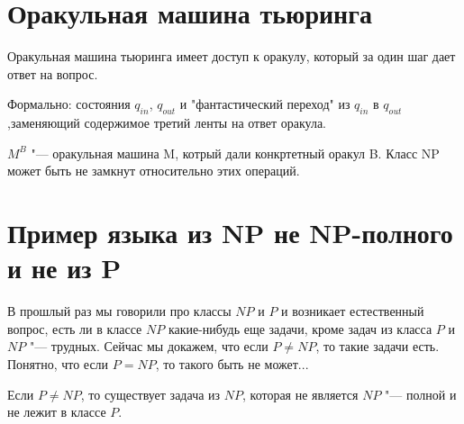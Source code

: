 ﻿
\section{Оракульная машина тьюринга}
Оракульная машина тьюринга имеет доступ к оракулу, который за один шаг
дает ответ на вопрос. 

Формально: состояния $q_{in}$, $q_{out}$  и "фантастический переход" из 
$q_{in}$ в $q_{out}$,заменяющий содержимое третий ленты на ответ оракула. 

$M^B$ "--- оракульная машина M, котрый дали конкртетный оракул B. Класс NP может 
быть не замкнут относительно этих операций. 

\section{Пример языка из NP не NP-полного и не из P}
В прошлый раз мы говорили про классы $NP$ и $P$ и 
возникает естественный вопрос, есть ли в классе 
$NP$ какие-нибудь еще задачи, кроме задач из 
класса $P$ и $NP$ "--- трудных. Сейчас мы докажем, 
что если $P \ne NP$, то такие задачи есть. Понятно, что
если $P = NP$, то такого быть не может...
\begin{theorem}
Если $P \ne NP$, то 
существует задача из $NP$, которая не 
является $NP$ "--- полной и не лежит в классе $P$.
\end{theorem}
